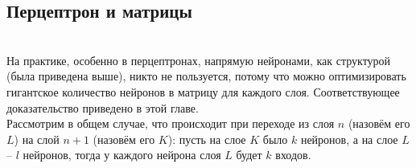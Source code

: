 \documentclass{article}
\begin{document}
    

    \subsection{Перцептрон и матрицы}
    \label{sec:matrix}
    \ \\

        
        На практике, особенно в перцептронах,
        напрямую нейронами,
        как структурой (была приведена выше),
        никто не пользуется, потому что можно оптимизировать
        гигантское количество нейронов в матрицу
        для каждого слоя.
        Соответствующее доказательство приведено в этой главе.\\
    
        Рассмотрим в общем случае, что происходит при переходе
        из слоя $n$ (назовём его $L$)
        на слой $n+1$ (назовём его $K$):
        пусть на слое $K$ было $k$ нейронов, а на слое $L$ -- $l$ нейронов,
        тогда у каждого нейрона слоя $L$ будет $k$ входов.
\end{document}
